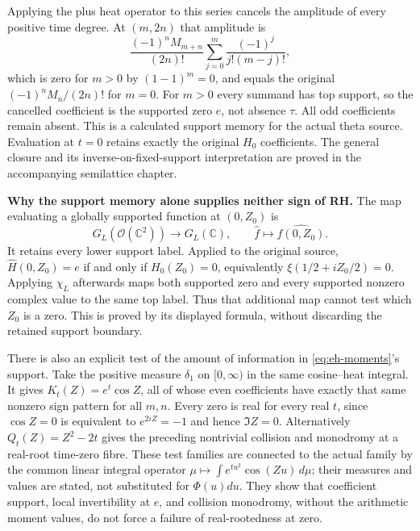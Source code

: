 \documentclass[11pt,a4paper]{article}
\theoremstyle{definition}\newtheorem{definition}[theorem]{Definition}
\begin{document}
Applying the plus heat operator to this series cancels the amplitude of
every positive time degree. At $(m,2n)$ that amplitude is
\[
 \frac{(-1)^nM_{m+n}}{(2n)!}
 \sum_{j=0}^m\frac{(-1)^j}{j!(m-j)!},
\]
which is zero for $m>0$ by $(1-1)^m=0$, and equals the original
$(-1)^nM_n/(2n)!$ for $m=0$. For $m>0$ every summand has top
support, so the cancelled coefficient is the supported zero $e$, not
absence $\tau$. All odd coefficients remain absent. This is a
calculated support memory for the actual theta source. Evaluation at
$t=0$ retains exactly the original $H_0$ coefficients. The general
closure and its inverse-on-fixed-support interpretation are proved
in the accompanying semilattice chapter.

\EH\textbf{Why the support memory alone supplies neither sign of RH.}
The map evaluating a globally supported function at $(0,Z_0)$ is
\[
 G_L(\mathcal O(\mathbb C^2))\longrightarrow G_L(\mathbb C),
 \qquad \widehat f\longmapsto\widehat{f(0,Z_0)}.
\]
It retains every lower support label. Applied to the original source,
$\widehat H(0,Z_0)=e$ if and only if $H_0(Z_0)=0$, equivalently
$\xi(1/2+iZ_0/2)=0$. Applying $\chi_L$ afterwards maps both supported
zero and every supported nonzero complex value to the same top label.
Thus that additional map cannot test which $Z_0$ is a zero. This is
proved by its displayed formula, without discarding the retained
support boundary.

There is also an explicit test of the amount of information in
\eqref{eq:eh-moments}'s support. Take the positive measure
$\delta_1$ on $[0,\infty)$ in the same cosine--heat integral. It gives
$K_t(Z)=e^t\cos Z$, all of whose even coefficients have exactly that
same nonzero sign pattern for all $m,n$. Every zero is real for every
real $t$, since $\cos Z=0$ is equivalent to $e^{2iZ}=-1$ and hence
$\Im Z=0$. Alternatively $Q_t(Z)=Z^2-2t$ gives the preceding
nontrivial collision and monodromy at a real-root time-zero fibre.
These test families are connected to the actual family by the common
linear integral operator $\mu\mapsto\int e^{tu^2}\cos(Zu)\,d\mu$;
their measures and values are stated, not substituted for $\Phi(u)du$.
They show that coefficient support, local invertibility at $e$, and
collision monodromy, without the arithmetic moment values, do not
force a failure of real-rootedness at zero.
\end{document}
